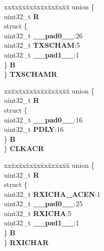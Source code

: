 \begin{DoxyCompactItemize}
\begin{tabbing}
\end{tabbing}\item 
\mbox{\label{structMLB__tag_a2ae4925dc2fa2767a1836d420af40a77}} 
\begin{tabbing}
xx\=xx\=xx\=xx\=xx\=xx\=xx\=xx\=xx\=\kill
union \{\\
\>uint32\_t {\bfseries R}\\
\>struct \{\\
\>\>uint32\_t {\bfseries \_\_pad0\_\_}:26\\
\>\>uint32\_t {\bfseries TXSCHAM}:5\\
\>\>uint32\_t {\bfseries \_\_pad1\_\_}:1\\
\>\} {\bfseries B}\\
\} {\bfseries TXSCHAMR}\\

\end{tabbing}\item 
\mbox{\label{structMLB__tag_a392a36735cd97bcb903f9a8e18749b1a}} 
\begin{tabbing}
xx\=xx\=xx\=xx\=xx\=xx\=xx\=xx\=xx\=\kill
union \{\\
\>uint32\_t {\bfseries R}\\
\>struct \{\\
\>\>uint32\_t {\bfseries \_\_pad0\_\_}:16\\
\>\>uint32\_t {\bfseries PDLY}:16\\
\>\} {\bfseries B}\\
\} {\bfseries CLKACR}\\

\end{tabbing}\item 
\mbox{\label{structMLB__tag_afb17b5db3c9f170297135bb36b802212}} 
\begin{tabbing}
xx\=xx\=xx\=xx\=xx\=xx\=xx\=xx\=xx\=\kill
union \{\\
\>uint32\_t {\bfseries R}\\
\>struct \{\\
\>\>uint32\_t {\bfseries RXICHA\_ACEN}:1\\
\>\>uint32\_t {\bfseries \_\_pad0\_\_}:25\\
\>\>uint32\_t {\bfseries RXICHA}:5\\
\>\>uint32\_t {\bfseries \_\_pad1\_\_}:1\\
\>\} {\bfseries B}\\
\} {\bfseries RXICHAR}\\


\end{tabbing}
\end{DoxyCompactItemize}
